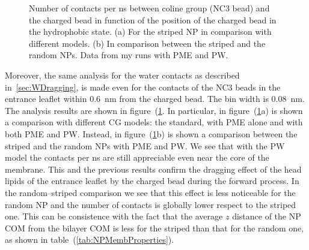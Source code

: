 \begin{figure}
	\center
	\caption{Number of contacts per ns between coline group (NC3 bead) and the charged bead in function of the position of the charged bead in the hydrophobic state. (a) For the striped \acs{NP} in comparison with different models. (b) In comparison between the striped and the random \acs{NP}s. Data from my runs with \acs{PME} and \acs{PW}.}
	\label{fig:NC3Contact}
\end{figure}

Moreover, the same analysis for the water contacts as described in~\ref{sec:WDragging}, is made even for the contacts of the NC$3$ beads in the entrance leaflet within $0.6$~nm from the charged bead. The bin width is $0.08$~nm. The analysis results are shown in figure~(\ref{fig:NC3Contact}. In particular, in figure~(\ref{fig:NC3Contact}a) is shown a comparison with different \ac{CG} \martini models: the standard, with \ac{PME} alone and with both \ac{PME} and \ac{PW}. Instead, in figure~(\ref{fig:NC3Contact}b) is shown a comparison between the striped and the random \acp{NP} with \ac{PME} and \ac{PW}. We see that with the \ac{PW} model the contacts per ns are still appreciable even near the core of the membrane. This and the previous results confirm the dragging effect of the head lipids of the entrance leaflet by the charged bead during the forward process. In the random--striped comparison we see that this effect is less noticeable for the random \ac{NP} and the number of contacts is globally lower respect to the striped one. This can be consistence with the fact that the average $z$ distance of the \ac{NP} \ac{COM} from the bilayer \ac{COM} is less for the striped than that for the random one, as shown in table~(\ref{tab:NPMembProperties}). 


